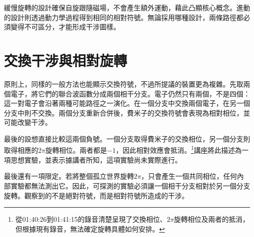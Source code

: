 \begin{classroomqa}
\end{classroomqa}

\begin{classroomqa}
\end{classroomqa}

緩慢旋轉的設計確保自旋跟隨磁場，不會產生額外運動，藉此凸顯核心概念。進動的設計則透過動力學過程得到相同的相對符號。無論採用哪種設計，兩條路徑都必須變得不可區分，才能形成干涉圖樣。

\begin{classroomqa}
\end{classroomqa}

\begin{classroomqa}
\end{classroomqa}

\section{交換干涉與相對旋轉}

原則上，同樣的一般方法也能顯示交換符號，不過所提議的裝置更為複雜。先取兩個電子，將它們的聯合波函數分成兩個相干分支。電子仍然只有兩個，不是四個：這一對電子會沿著兩種可能路徑之一演化。在一個分支中交換兩個電子，在另一個分支中則不交換。兩個分支重新合併後，費米子的交換符號會表現為相對相位，並可能改變干涉。

最後的設想直接比較這兩個負號。一個分支取得費米子的交換相位，另一個分支則取得相應的\(2\pi\)旋轉相位。兩者都是\(-1\)，因此相對效應會抵消。\footnote{從01:40:26到01:41:15的錄音清楚呈現了交換相位、\(2\pi\)旋轉相位及兩者的抵消，但根據現有錄音，無法確定旋轉具體如何安排。}講座將此描述為一項思想實驗，並表示據講者所知，這項實驗尚未實際進行。

\begin{classroomqa}
\end{classroomqa}

最後還有一項限定。若將整個孤立世界旋轉\(2\pi\)，只會產生一個共同相位，任何內部實驗都無法測出它。因此，可探測的實驗必須讓一個相干分支相對於另一個分支旋轉。觀察到的不是絕對符號，而是相對符號所造成的干涉。
